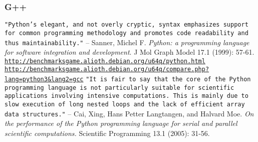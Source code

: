 \documentclass{article}
\begin{document}
\subsubsection{G++}

\begin{thebibliography}{9}
\texttt{"Python’s elegant, and not overly cryptic, syntax emphasizes support for common programming methodology and promotes code readability and thus maintainability."} -- Sanner, Michel F. \emph{Python: a programming language for software integration and development}. J Mol Graph Model 17.1 (1999): 57-61.
\href{http://benchmarksgame.alioth.debian.org/u64q/python.html}{\texttt{http://benchmarksgame.alioth.debian.org/u64q/python.html}}
\href{http://benchmarksgame.alioth.debian.org/u64q/compare.php?lang=python3\&lang2=gcc}{\texttt{http://benchmarksgame.alioth.debian.org/u64q/compare.php?lang=python3\&lang2=gcc}}
\texttt{"It is fair to say that the core of the Python programming language is not particularly suitable for scientific applications involving intensive computations. This is mainly due to slow execution of long nested loops and the lack of efficient array data structures."} -- Cai, Xing, Hans Petter Langtangen, and Halvard Moe. \emph{On the performance of the Python programming language for serial and parallel scientific computations.} Scientific Programming 13.1 (2005): 31-56.
\end{thebibliography}
\end{document}
